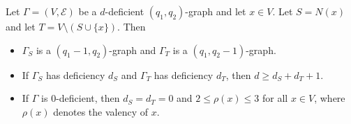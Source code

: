 Let $\Gamma = (V, \mathcal{E})$ be a $d$-deficient $(q_1, q_2)$-graph and let $x \in V$. Let $S = N(x)$ and let $T = V \setminus (S \cup \{x\})$. Then

\begin{itemize}
\item[(a)] $\Gamma_S$ is a $(q_1 - 1, q_2)$-graph and $\Gamma_T$ is a $(q_1, q_2 - 1)$-graph.
\item[(b)] If $\Gamma_S$ has deficiency $d_S$ and $\Gamma_T$ has deficiency $d_T$, then $d \geq d_S + d_T + 1$.
\item[(c)] If $\Gamma$ is $0$-deficient, then $d_S = d_T = 0$ and $2 \leq \rho(x) \leq 3$ for all $x \in V$, where $\rho(x)$ denotes the valency of $x$.
\end{itemize}
